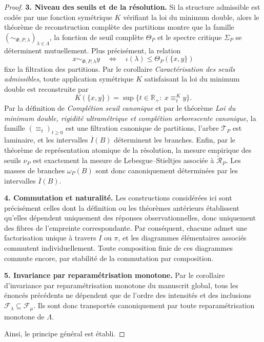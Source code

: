 \documentclass[11pt,a4paper]{article}
\begin{document}
\begin{appendices}
\begin{proof}
\medskip
\noindent\textbf{3. Niveau des seuils et de la résolution.}
Si la structure admissible est codée par une fonction symétrique \(K\) vérifiant la loi du minimum double, alors le théorème de reconstruction complète des partitions montre que la famille \((\sim_{\Phi,P,\lambda})_{\lambda\in\Lambda}\), la fonction de seuil complète \(\Theta_P\) et le spectre critique \(\Sigma_P\) se déterminent mutuellement. Plus précisément, la relation
\[
x\sim_{\Phi,P,\lambda}y
\quad\Longleftrightarrow\quad
\iota(\lambda)\le \Theta_P(\{x,y\})
\]
fixe la filtration des partitions. Par le corollaire \emph{Caractérisation des seuils admissibles}, toute application symétrique \(K\) satisfaisant la loi du minimum double est reconstruite par
\[
K(\{x,y\})=\sup\{t\in\mathbb R_+:\ x\equiv_t^K y\}.
\]
Par la définition de \emph{Complétion seuil canonique} et par le théorème \emph{Loi du minimum double, rigidité ultramétrique et complétion arborescente canonique}, la famille \((\equiv_t)_{t\ge 0}\) est une filtration canonique de partitions, l'arbre \(\mathcal T_P\) est laminaire, et les intervalles \(\overline I(B)\) déterminent les branches. Enfin, par le théorème de représentation atomique de la résolution, la mesure empirique des seuils \(\nu_P\) est exactement la mesure de Lebesgue--Stieltjes associée à \(\widetilde{\mathcal R}_P\). Les masses de branches \(\omega_P(B)\) sont donc canoniquement déterminées par les intervalles \(\overline I(B)\).

\medskip
\noindent\textbf{4. Commutation et naturalité.}
Les constructions considérées ici sont précisément celles dont la définition ou les théorèmes antérieurs établissent qu'elles dépendent uniquement des réponses observationnelles, donc uniquement des fibres de l'empreinte correspondante. Par conséquent, chacune admet une factorisation unique à travers \(I\) ou \(\pi\), et les diagrammes élémentaires associés commutent individuellement. Toute composition finie de ces diagrammes commute encore, par stabilité de la commutation par composition.

\medskip
\noindent\textbf{5. Invariance par reparamétrisation monotone.}
Par le corollaire d'invariance par reparamétrisation monotone du manuscrit global, tous les énoncés précédents ne dépendent que de l'ordre des intensités et des inclusions \(\mathcal F_\lambda\subseteq\mathcal F_\mu\). Ils sont donc transportés canoniquement par toute reparamétrisation monotone de \(\Lambda\).

Ainsi, le principe général est établi.
\end{proof}


\end{appendices}
\end{document}
